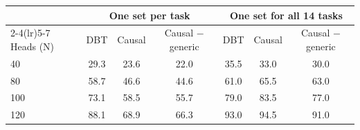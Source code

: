 \begin{tabular}{@{}lcccccc@{}}
\toprule
 & \multicolumn{3}{c}{One set per task} & \multicolumn{3}{c}{One set for all 14 tasks} \\
\cmidrule(lr){2-4}\cmidrule(lr){5-7}
Heads (N) & DBT & Causal & Causal $-$ generic & DBT & Causal & Causal $-$ generic \\
\midrule
40 & 29.3 & 23.6 & 22.0 & 35.5 & 33.0 & 30.0 \\
80 & 58.7 & 46.6 & 44.6 & 61.0 & 65.5 & 63.0 \\
100 & 73.1 & 58.5 & 55.7 & 79.0 & 83.5 & 77.0 \\
120 & 88.1 & 68.9 & 66.3 & 93.0 & 94.5 & 91.0 \\
\bottomrule
\end{tabular}
